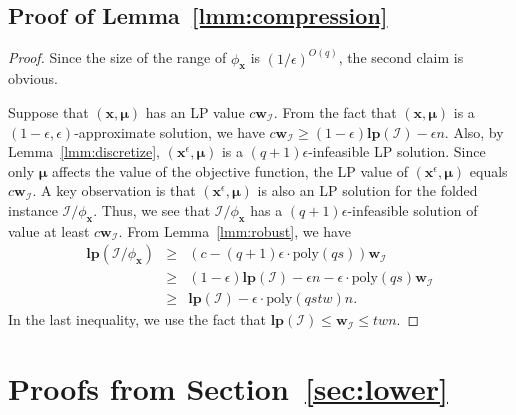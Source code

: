 \documentclass[letterpaper, 11pt]{article}
\newcommand{\calI}{\mathcal{I}}
\newcommand{\biw}{\boldsymbol{w}}
\newcommand{\bix}{\boldsymbol{x}}
\newcommand{\bimu}{\boldsymbol{\mu}}
\newcommand{\lp}{\mathbf{lp}}
\newcommand{\poly}{\mathrm{poly}}
\begin{document}
\subsection{Proof of Lemma~\ref{lmm:compression}}
\begin{proof}
  Since the size of the range of $\phi_{\bix}$ is $(1/\epsilon)^{O(q)}$, the second claim is obvious.

  Suppose that $(\bix,\bimu)$ has an LP value $c\biw_{\calI}$.
  From the fact that $(\bix,\bimu)$ is a $(1-\epsilon,\epsilon)$-approximate solution, 
  we have $c\biw_{\calI} \geq (1-\epsilon)\lp(\calI)-\epsilon n$.
  Also, by Lemma~\ref{lmm:discretize}, 
  $(\bix^\epsilon,\bimu)$ is a $(q+1)\epsilon$-infeasible LP solution.
  Since only $\bimu$ affects the value of the objective function, 
  the LP value of $(\bix^\epsilon,\bimu)$ equals $c\biw_{\calI}$.
  A key observation is that $(\bix^\epsilon,\bimu)$ is also an LP solution for the folded instance $\calI/\phi_{\bix}$.
  Thus, we see that $\calI/\phi_{\bix}$ has a $(q+1)\epsilon$-infeasible solution of value at least $c\biw_{\calI}$.
  From Lemma~\ref{lmm:robust}, we have
  \begin{eqnarray*}
    \lp(\calI/\phi_{\bix})
    &\geq&
    (c - (q+1)\epsilon \cdot \poly(qs)) \biw_{\calI}  \\
    &\geq&
    (1-\epsilon)\lp(\calI)-\epsilon n -  \epsilon\cdot \poly(qs) \biw_{\calI} \\
    &\geq &
    \lp(\calI) - \epsilon \cdot \poly(qstw)n.
  \end{eqnarray*}
  In the last inequality,
  we use the fact that $\lp(\calI)\leq \biw_{\calI} \leq twn$.
\end{proof}


\section{Proofs from Section~\ref{sec:lower}}\label{apx:lower-appendix}
\end{document}
